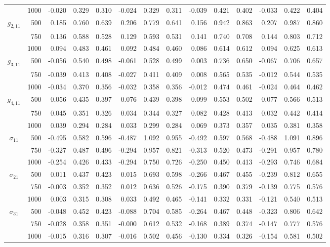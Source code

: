 \begin{table}[htbp]
\begin{adjustbox}{width=\textwidth}
\begin{tabular}{crrrrrrrrrrrrr}
 & 1000 & -0.020 & 0.329 & 0.310 & -0.024 & 0.329 & 0.311 & -0.039 & 0.421 & 0.402 & -0.033 & 0.422 & 0.404 \\
$g_{2,11}$ & 500 & 0.185 & 0.760 & 0.639 & 0.206 & 0.779 & 0.641 & 0.156 & 0.942 & 0.863 & 0.207 & 0.987 & 0.860 \\
 & 750 & 0.136 & 0.588 & 0.528 & 0.129 & 0.593 & 0.531 & 0.141 & 0.740 & 0.708 & 0.144 & 0.803 & 0.712 \\
 & 1000 & 0.094 & 0.483 & 0.461 & 0.092 & 0.484 & 0.460 & 0.086 & 0.614 & 0.612 & 0.094 & 0.625 & 0.613 \\
$g_{3,11}$ & 500 & -0.056 & 0.540 & 0.498 & -0.061 & 0.528 & 0.499 & 0.003 & 0.736 & 0.650 & -0.067 & 0.706 & 0.657 \\
 & 750 & -0.039 & 0.413 & 0.408 & -0.027 & 0.411 & 0.409 & 0.008 & 0.565 & 0.535 & -0.012 & 0.544 & 0.535 \\
 & 1000 & -0.034 & 0.370 & 0.356 & -0.032 & 0.358 & 0.356 & -0.012 & 0.474 & 0.461 & -0.024 & 0.464 & 0.462 \\
$g_{4,11}$ & 500 & 0.056 & 0.435 & 0.397 & 0.076 & 0.439 & 0.398 & 0.099 & 0.553 & 0.502 & 0.077 & 0.566 & 0.513 \\
 & 750 & 0.045 & 0.351 & 0.326 & 0.034 & 0.344 & 0.327 & 0.082 & 0.428 & 0.413 & 0.032 & 0.442 & 0.414 \\
 & 1000 & 0.039 & 0.294 & 0.284 & 0.033 & 0.299 & 0.284 & 0.069 & 0.373 & 0.357 & 0.035 & 0.381 & 0.358 \\
$\sigma_{11}$ & 500 & -0.495 & 0.582 & 0.596 & -0.487 & 1.092 & 0.955 & -0.492 & 0.597 & 0.568 & -0.488 & 1.091 & 0.896 \\
 & 750 & -0.327 & 0.487 & 0.496 & -0.294 & 0.957 & 0.821 & -0.313 & 0.520 & 0.473 & -0.291 & 0.957 & 0.780 \\
 & 1000 & -0.254 & 0.426 & 0.433 & -0.294 & 0.750 & 0.726 & -0.250 & 0.450 & 0.413 & -0.293 & 0.746 & 0.684 \\
$\sigma_{21}$ & 500 & 0.011 & 0.437 & 0.423 & 0.015 & 0.693 & 0.598 & -0.266 & 0.467 & 0.455 & -0.239 & 0.812 & 0.655 \\
 & 750 & -0.003 & 0.352 & 0.352 & 0.012 & 0.636 & 0.526 & -0.175 & 0.390 & 0.379 & -0.139 & 0.775 & 0.576 \\
 & 1000 & 0.003 & 0.315 & 0.308 & 0.033 & 0.492 & 0.465 & -0.141 & 0.332 & 0.331 & -0.121 & 0.540 & 0.513 \\
$\sigma_{31}$ & 500 & -0.048 & 0.452 & 0.423 & -0.088 & 0.704 & 0.585 & -0.264 & 0.467 & 0.448 & -0.323 & 0.806 & 0.642 \\
 & 750 & -0.028 & 0.358 & 0.351 & -0.000 & 0.612 & 0.532 & -0.168 & 0.389 & 0.374 & -0.147 & 0.777 & 0.576 \\
 & 1000 & -0.015 & 0.316 & 0.307 & -0.016 & 0.502 & 0.456 & -0.130 & 0.334 & 0.326 & -0.154 & 0.581 & 0.502 \\
\bottomrule
\end{tabular}
\end{adjustbox}
\end{table}
